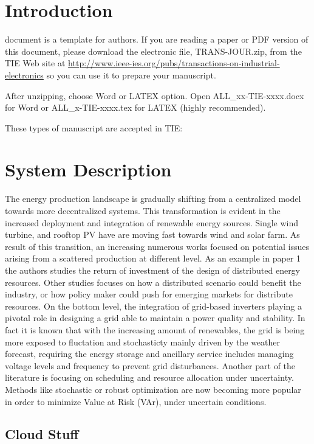 
\section{Introduction}

 document is a template for authors. If you are reading a paper or PDF version of this document, please download the electronic file, TRANS-JOUR.zip, from the TIE Web site at \url{http://www.ieee-ies.org/pubs/transactions-on-industrial-electronics} so you can use it to prepare your manuscript.

After unzipping, choose Word or LATEX option. Open ALL\_xx-TIE-xxxx.docx for Word or ALL\_x-TIE-xxxx.tex for LATEX (highly recommended).

These types of manuscript are accepted in TIE:

\section{System Description}

The energy production landscape is gradually shifting from a centralized model towards 
more decentralized systems. 
This transformation is evident in the increased deployment and integration of 
renewable energy sources. Single wind turbine, and rooftop PV have are moving fast towards wind and solar farm.  
 As result of this transition, an increasing numerous works focused on potential issues arising from 
a scattered production at different level. As an example in paper 1 the authors studies the return of investment of the design
of distributed energy resources. Other studies focuses on how a distributed scenario could benefit the industry, 
or how policy maker could push for emerging markets for distribute resources. On the bottom level, the integration of grid-based inverters
playing a pivotal role in designing a grid able to maintain a power quality and stability.
In fact it is known that with the increasing amount of renewables, the grid is being more exposed to fluctation 
and stochasticty mainly driven by the weather forecast, requiring the energy storage and ancillary service includes 
managing voltage levels and frequency to prevent grid disturbances.
Another part of the literature is focusing on scheduling and resource allocation under uncertainty. 
Methods like stochastic or robust optimization are now becoming more popular in order to minimize Value at Risk (VAr), under uncertain conditions. 

\subsection{Cloud Stuff }

